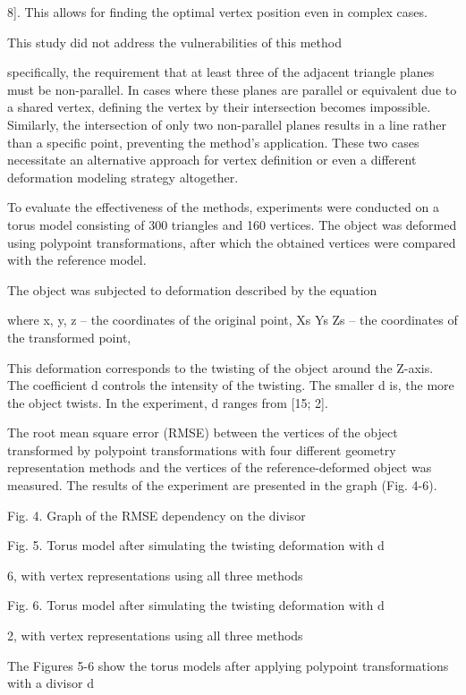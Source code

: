 \documentclass[12pt,a4paper]{article}
\begin{document}
\par
8]. This allows for finding the optimal vertex position even in complex cases.
\par
This study did not address the vulnerabilities of this method
\par
specifically, the requirement that at least three of the adjacent triangle planes must be non-parallel. In cases where these planes are parallel or equivalent due to a shared vertex, defining the vertex by their intersection becomes impossible. Similarly, the intersection of only two non-parallel planes results in a line rather than a specific point, preventing the method’s application. These two cases necessitate an alternative approach for vertex definition or even a different deformation modeling strategy altogether.
\par
To evaluate the effectiveness of the methods, experiments were conducted on a torus model consisting of 300 triangles and 160 vertices. The object was deformed using polypoint transformations, after which the obtained vertices were compared with the reference model.
\par
The object was subjected to deformation described by the equation
\par
where x, y, z – the coordinates of the original point, Xs Ys Zs – the coordinates of the transformed point,
\par
This deformation corresponds to the twisting of the object around the Z-axis. The coefficient d controls the intensity of the twisting. The smaller d is, the more the object twists. In the experiment, d ranges from [15; 2].
\par
The root mean square error (RMSE) between the vertices of the object transformed by polypoint transformations with four different geometry representation methods and the vertices of the reference-deformed object was measured. The results of the experiment are presented in the graph (Fig. 4-6).
\par
Fig. 4. Graph of the RMSE dependency on the divisor
\par
Fig. 5. Torus model after simulating the twisting deformation with d
\par
6, with vertex representations using all three methods
\par
Fig. 6. Torus model after simulating the twisting deformation with d
\par
2, with vertex representations using all three methods
\par
The Figures 5-6 show the torus models after applying polypoint transformations with a divisor d
\end{document}
